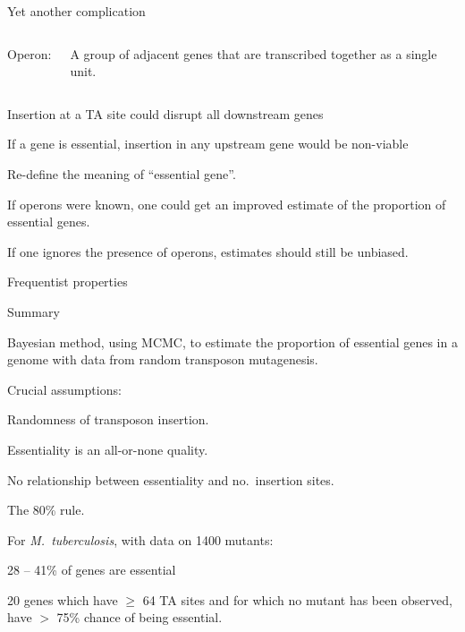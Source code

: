 \documentclass[aspectratio=169,12pt,t]{beamer}
\begin{document}
\begin{frame}{Yet another complication}

  \begin{columns}

\hfill {\color{title} Operon:}


A group of adjacent genes that are transcribed
together as a single unit.
\end{columns}



\bi
\item Insertion at a TA site could disrupt all downstream genes

\item If a gene is essential, insertion in any upstream gene would be
non-viable

\item Re-define the meaning of ``essential gene''.

\item If operons were known, one could get an improved estimate of the
proportion of essential genes.

\item If one ignores the presence of operons, estimates should still
be unbiased.
\ei

\note{
}
\end{frame}




\begin{frame}[c]{Frequentist properties}


\note{
}
\end{frame}


\begin{frame}{Summary}

  \bbi
\item Bayesian method, using MCMC, to estimate the proportion of
essential genes in a genome with data from random transposon
mutagenesis.

\item Crucial assumptions:

\bi
\item {\hilit Randomness of transposon insertion.}

\item Essentiality is an all-or-none quality.

\item No relationship between essentiality and no.\ insertion
sites.

\item The 80\% rule.
\ei

\item For \emph{M.\ tuberculosis}, with data on 1400 mutants:
\bi
\item {\color{title} 28 -- 41\%} of genes are essential
\item 20 genes which have $\ge$ 64 TA sites and for which no mutant has been
observed, have {\color{title} $>$ 75\%} chance of being essential.
\ei

\ei

\note{
}
\end{frame}
\end{document}
